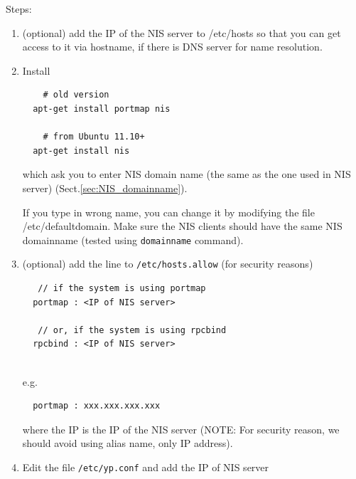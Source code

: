 Steps:
\begin{enumerate}
  \item (optional) add the IP of the NIS server to /etc/hosts so that you can
  get access to it via hostname, if there is DNS server for name resolution.
  
  \item Install
  \begin{verbatim}
    # old version
  apt-get install portmap nis
  
    # from Ubuntu 11.10+
  apt-get install nis  
  \end{verbatim} 
  
  which ask you to enter NIS domain name (the same as the one used in NIS
  server) (Sect.\ref{sec:NIS_domainname}).  
  
  If you type in wrong name, you can change it by modifying the file
  /etc/defaultdomain. Make sure the NIS clients should have the same  NIS
  domainname (tested using \verb!domainname! command).
    
 \item (optional) add the line to  \verb!/etc/hosts.allow! (for security
 reasons)
 
  \begin{verbatim}
   // if the system is using portmap
  portmap : <IP of NIS server>
  
   // or, if the system is using rpcbind
  rpcbind : <IP of NIS server>
  
  \end{verbatim}
  e.g.
  \begin{verbatim}
  portmap : xxx.xxx.xxx.xxx
  \end{verbatim}
  where the IP is the IP of the NIS server (NOTE: For security reason, we
  should avoid using alias name, only IP address).

  
 
  \item Edit the file \verb!/etc/yp.conf! and add the IP of NIS server


\end{enumerate}
